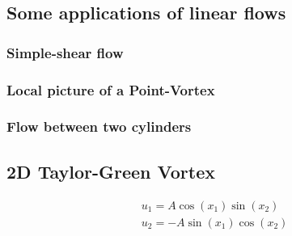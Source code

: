 \documentclass[11pt,a4paper]{article}
\newcommand{\1}{\vect{1}}
\begin{document}
\subsection{Some applications of linear flows}

\subsubsection{Simple-shear flow}

\subsubsection{Local picture of a Point-Vortex}

\subsubsection{Flow between two cylinders}

\subsection{2D Taylor-Green Vortex}
\begin{align*}
&u_1 =  A \cos(x_1)\sin(x_2)\\
&u_2 = -A \sin(x_1)\cos(x_2)
\end{align*}
\end{document}
